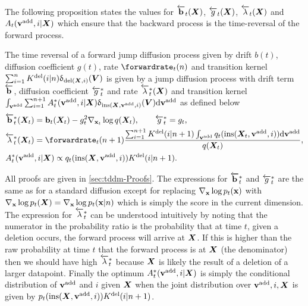 The following proposition states the values for $\overleftarrow{\mathbf{b}}_t({\bm{X}})$, $\overleftarrow{g}_t({\bm{X}})$, $\overleftarrow{\lambda}_t({\bm{X}})$ and $A_t({\mathbf{v}}^{\textup{add}}, i | {\bm{X}})$ which ensure that the backward process is the time-reversal of the forward process.
\begin{proposition}
\label{prop:time_reversal}
The time reversal of a forward jump diffusion process given by drift $b(t)$, diffusion coefficient $g(t)$, rate $\forwardrate_t(n)$ and transition kernel $\sum_{i=1}^n K^{\textup{del}}(i | n) \updelta_{\textup{del}({\bm{X}}, i)}({\bm{V}})$ is given by a jump diffusion process with drift term $\overleftarrow{\mathbf{b}}$, diffusion coefficient $\overleftarrow{g}_{t}^*$ and rate $\overleftarrow{\lambda}_t^*({\bm{X}})$ and transition kernel $\int_{{\mathbf{v}}^{\textup{add}}} \sum_{i=1}^{n+1}  A^*_t({\mathbf{v}}^{\textup{add}}, i | {\bm{X}}) \updelta_{\textup{ins}({\bm{X}}, {\mathbf{v}}^{\textup{add}}, i)}({\bm{V}}) \mathrm{d} {\mathbf{v}}^{\textup{add}}$ as defined below
\begin{align}
    &\backwarddrift_{t}^*(\mX_t) = \rvb_{t}(\mX_t) - g_t^2 \nabla_{\rvx_t} \log q(\mX_t), \qquad \backwarddiffcoeff_{t}^* = g_{t},\\
    & \backwardrate_{t}^*(\mX_t) = \forwardrate_{t}(n+1) \frac{ \sum_{i=1}^{n+1} \delidxdist(i | n+1) \int_{\yadd} q_t(\textup{ins}(\mX_t, \yadd, i)) \rmd \yadd }{q(\mX_t)},\\
    & \autonet_{t}^*( \yadd, i | \mX) \propto q_{t}(\textup{ins}(\mX, \yadd, i) ) \delidxdist(i| n+1).
\end{align}
\end{proposition}
All proofs are given in \cref{sec:tddm-Proofs}. The expressions for $\overleftarrow{\mathbf{b}}_t^*$ and $\overleftarrow{g}^*_t$ are the same as for a standard diffusion except for replacing $\nabla_{{\mathbf{x}}} \log p_t({\mathbf{x}})$ with $\nabla_{{\mathbf{x}}} \log p_t({\bm{X}}) = \nabla_{{\mathbf{x}}} \log p_t({\mathbf{x}} | n)$ which is simply the score in the current dimension.
The expression for $\overleftarrow{\lambda}_t^*$ can be understood intuitively by noting that the numerator in the probability ratio is the probability that at time $t$, given a deletion occurs, the forward process will arrive at ${\bm{X}}$. If this is higher than the raw probability at time $t$ that the forward process is at ${\bm{X}}$ (the denominator) then we should have high $\overleftarrow{\lambda}_t^*$ because ${\bm{X}}$ is likely the result of a deletion of a larger datapoint.
Finally the optimum $A^*_t({\mathbf{v}}^{\textup{add}}, i | {\bm{X}})$ is simply the conditional distribution of ${\mathbf{v}}^{\textup{add}}$ and $i$ given ${\bm{X}}$ when the joint distribution over ${\mathbf{v}}^{\textup{add}}, i, {\bm{X}}$ is given by $p_{t}(\text{ins}({\bm{X}}, {\mathbf{v}}^{\textup{add}}, i) ) K^{\textup{del}}(i| n+1)$. 

